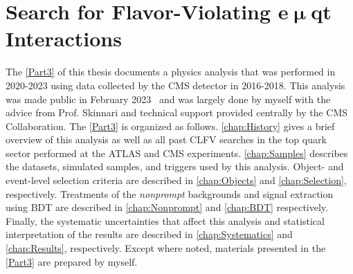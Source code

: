 \part{Search for Flavor-Violating e$\bm{\upmu}$qt Interactions}
\label{Part3}
The \autoref{Part3} of this thesis documents a physics analysis that was performed in 2020-2023 using data collected by the \ac{CMS} detector in 2016-2018. This analysis was made public in February 2023~\cite{CMS:2023phe} and was largely done by myself with the advice from Prof. Skinnari and technical support provided centrally by the \ac{CMS} Collaboration. The \autoref{Part3} is organized as follows. \autoref{chap:History} gives a brief overview of this analysis as well as all past \ac{CLFV} searches in the top quark sector performed at the \ac{ATLAS} and \ac{CMS} experiments. \autoref{chap:Samples} describes the datasets, simulated samples, and triggers used by this analysis. Object- and event-level selection criteria are described in \autoref{chap:Objects} and \autoref{chap:Selection}, respectively. Treatments of the \emph{nonprompt} backgrounds and signal extraction using \ac{BDT} are described in \autoref{chap:Nonprompt} and \autoref{chap:BDT} respectively. Finally, the systematic uncertainties that affect this analysis and statistical interpretation of the results are described in \autoref{chap:Systematics} and \autoref{chap:Results}, respectively. Except where noted, materials presented in the \autoref{Part3} are prepared by myself.







